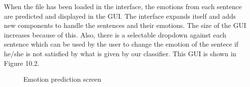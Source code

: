 \documentclass[oneside,a4paper,12pt]{book}
\begin{document}
When the file has been loaded in the interface, the emotions from each sentence are predicted and displayed in the GUI. The interface expands itself and adds new components to handle the sentences and their emotions. The size of the GUI increases because of this. Also, there is a selectable dropdown against each sentence which can be used by the user to change the emotion of the sentece if he/she is not satisfied by what is given by our classifier. This GUI is shown in Figure 10.2.
 \begin{center}
 	\begin{figure}[!htbp]
 		\centering
 		\caption{Emotion prediction screen}
 		\label{fig:Emotion prediction screen}
 	\end{figure}
 \end{center} 
\end{document}
